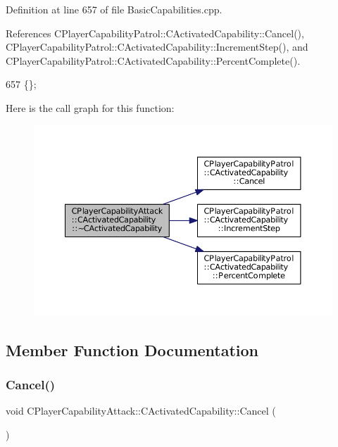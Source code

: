 Definition at line 657 of file Basic\+Capabilities.\+cpp.



References C\+Player\+Capability\+Patrol\+::\+C\+Activated\+Capability\+::\+Cancel(), C\+Player\+Capability\+Patrol\+::\+C\+Activated\+Capability\+::\+Increment\+Step(), and C\+Player\+Capability\+Patrol\+::\+C\+Activated\+Capability\+::\+Percent\+Complete().


\begin{DoxyCode}
657 \{\};
\end{DoxyCode}
Here is the call graph for this function\+:\nopagebreak
\begin{figure}[H]
\begin{center}
\leavevmode
\includegraphics[width=350pt]{classCPlayerCapabilityAttack_1_1CActivatedCapability_a8524b57d63ce6e899630ef56326be98b_cgraph}
\end{center}
\end{figure}


\subsection{Member Function Documentation}
\hypertarget{classCPlayerCapabilityAttack_1_1CActivatedCapability_a0796fbda8a35b60a2320becfdf2b5c13}{}\label{classCPlayerCapabilityAttack_1_1CActivatedCapability_a0796fbda8a35b60a2320becfdf2b5c13} 
\subsubsection{\texorpdfstring{Cancel()}{Cancel()}}
{\footnotesize\ttfamily void C\+Player\+Capability\+Attack\+::\+C\+Activated\+Capability\+::\+Cancel (\begin{DoxyParamCaption}{ }\end{DoxyParamCaption})\hspace{0.3cm}{\ttfamily [virtual]}}



